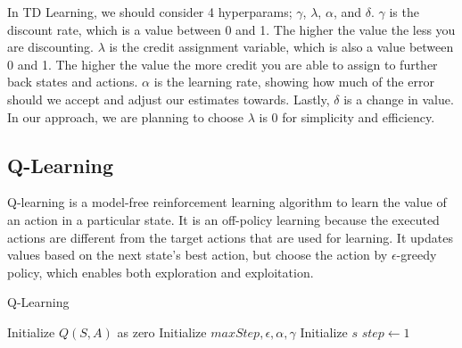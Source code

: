 \documentclass{article}
\begin{document}
In TD Learning, we should consider 4 hyperparams; $\gamma$, $\lambda$, $\alpha$, and $\delta$. $\gamma$ is the discount rate, which is a value between 0 and 1. The higher the value the less you are discounting.  $\lambda$ is the credit assignment variable, which is also a value between 0 and 1. The higher the value the more credit you are able to assign to further back states and actions. $\alpha$ is the learning rate, showing how much of the error should we accept and adjust our estimates towards. Lastly, $\delta$ is a change in value. In our approach, we are planning to choose $\lambda$ is 0 for simplicity and efficiency.


\subsection{Q-Learning}

Q-learning is a model-free reinforcement learning algorithm to learn the value of an action in a particular state. It is an off-policy learning because the executed actions are different from the target actions that are used for learning. It updates values based on the next state's best action, but choose the action by $\epsilon$-greedy policy, which enables both exploration and exploitation.

\begin{algorithm}[H]
\caption{Q-Learning}\label{alg:one}
Initialize $Q(S, A)$ as zero\;
Initialize $maxStep, \epsilon, \alpha, \gamma$\;
Initialize $s$ 
$step \gets 1$\;

\end{algorithm}
\end{document}
